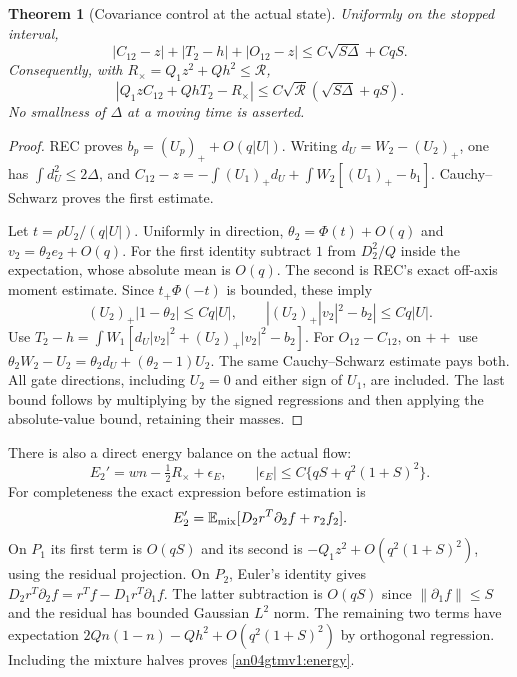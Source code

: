 \documentclass[11pt]{article}
\newtheorem{theorem}{Theorem}\newtheorem{lemma}{Lemma}
\newcommand{\E}{\mathbb E}\newcommand{\dd}{\,d}
\begin{document}
\begin{theorem}[Covariance control at the actual state]
\label{an04gtmv1:covariances}
Uniformly on the stopped interval,
\begin{equation}\label{an04gtmv1:covbound}
 |C_{12}-z|+|T_2-h|+|O_{12}-z|
                    \le C\sqrt{S\Delta}+CqS.
\end{equation}
Consequently, with $R_\times=Q_1z^2+Qh^2\le\mathcal R$,
\begin{equation}\label{an04gtmv1:source}
 |Q_1zC_{12}+QhT_2-R_\times|
            \le C\sqrt{\mathcal R}(\sqrt{S\Delta}+qS).
\end{equation}
No smallness of $\Delta$ at a moving time is asserted.
\end{theorem}
\begin{proof}
REC proves $b_p=(U_p)_++O(q|U|)$.
Writing $d_U=W_2-(U_2)_+$, one has $\int d_U^2\le2\Delta$,
and
$C_{12}-z=-\int(U_1)_+d_U+\int W_2[(U_1)_+-b_1]$.
Cauchy--Schwarz proves the first estimate.

Let $t=\rho U_2/(q|U|)$. Uniformly in direction,
$\theta_2=\Phi(t)+O(q)$ and $v_2=\theta_2e_2+O(q)$.
For the first identity subtract $1$ from $D_2^2/Q$ inside
the expectation, whose absolute mean is $O(q)$.
The second is REC's exact off-axis moment estimate.
Since $t_+\Phi(-t)$ is bounded, these imply
\[
 (U_2)_+|1-\theta_2|\le Cq|U|,\qquad
 |(U_2)_+|v_2|^2-b_2|\le Cq|U|.
\]
Use
$T_2-h=\int W_1[d_U|v_2|^2+(U_2)_+|v_2|^2-b_2]$.
For $O_{12}-C_{12}$, on $++$ use
$\theta_2W_2-U_2=\theta_2d_U+(\theta_2-1)U_2$.
The same Cauchy--Schwarz estimate pays both. All gate directions,
including $U_2=0$ and either sign of $U_1$, are included.
The last bound follows by multiplying by the signed regressions
and then applying the absolute-value bound, retaining their masses.
\end{proof}

There is also a direct energy balance on the actual flow:
\begin{equation}\label{an04gtmv1:energy}
 E_2'=wn-\tfrac12R_\times+\epsilon_E,
 \qquad |\epsilon_E|\le C\{qS+q^2(1+S)^2\}.
\end{equation}
For completeness the exact expression before estimation is
\[
 E_2'=\E_{\rm mix}[D_2r^T\partial_2f+r_2f_2].
\]
On $P_1$ its first term is $O(qS)$ and its second is
$-Q_1z^2+O(q^2(1+S)^2)$, using the residual projection.
On $P_2$, Euler's identity gives
$D_2r^T\partial_2f=r^Tf-D_1r^T\partial_1f$.
The latter subtraction is $O(qS)$ since $\|\partial_1f\|\le S$
and the residual has bounded Gaussian $L^2$ norm.
The remaining two terms have expectation
$2Qn(1-n)-Qh^2+O(q^2(1+S)^2)$ by orthogonal regression.
Including the mixture halves proves \eqref{an04gtmv1:energy}.
\end{document}
